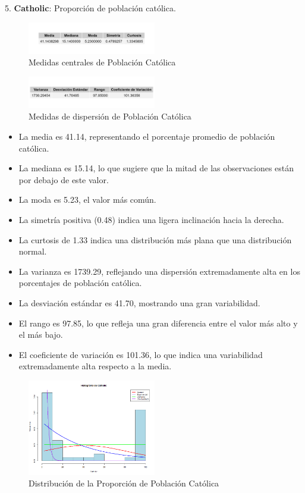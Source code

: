 \documentclass{article}
\begin{document}
5. \textbf{Catholic}: Proporción de población católica.
\begin{figure}[H]
 \centering
 \includegraphics[width=0.5\textwidth]{Swiss/Catholic_central.png}
 \caption{Medidas centrales de Población Católica}
\end{figure}

\begin{figure}[H]
 \centering
 \includegraphics[width=0.5\textwidth]{Swiss/Catholic_dispersion.png}
 \caption{Medidas de dispersión de Población Católica}
\end{figure}
   \begin{itemize}
       \item La media es 41.14, representando el porcentaje promedio de población católica.
       \item La mediana es 15.14, lo que sugiere que la mitad de las observaciones están por debajo de este valor.
       \item La moda es 5.23, el valor más común.
       \item La simetría positiva (0.48) indica una ligera inclinación hacia la derecha.
       \item La curtosis de 1.33 indica una distribución más plana que una distribución normal.
       \item La varianza es 1739.29, reflejando una dispersión extremadamente alta en los porcentajes de población católica.
       \item La desviación estándar es 41.70, mostrando una gran variabilidad.
       \item El rango es 97.85, lo que refleja una gran diferencia entre el valor más alto y el más bajo.
       \item El coeficiente de variación es 101.36, lo que indica una variabilidad extremadamente alta respecto a la media.
   \end{itemize}

   \begin{figure}[H]
    \centering
    \includegraphics[width=0.5\textwidth]{Histogramas/histogram_catholic.png}
    \caption{Distribución de la Proporción de Población Católica}
    \end{figure}
\end{document}
